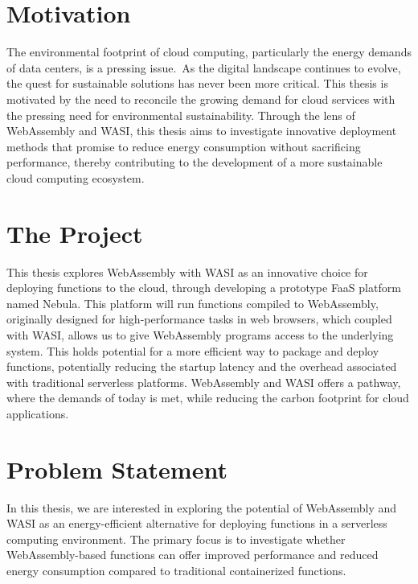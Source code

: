 \documentclass[
  table]{report}
\begin{document}
\section{Motivation}
\label{sect:motivation}

The environmental footprint of cloud computing, particularly the energy
demands of data centers, is a pressing issue.~As the digital landscape
continues to evolve, the quest for sustainable solutions has never been
more critical. This thesis is motivated by the need to reconcile the
growing demand for cloud services with the pressing need for
environmental sustainability. Through the lens of WebAssembly and
\ac{WASI}, this thesis aims to investigate innovative deployment methods
that promise to reduce energy consumption without sacrificing
performance, thereby contributing to the development of a more
sustainable cloud computing ecosystem.

\section{The Project}
\label{sect:project}

This thesis explores WebAssembly with \ac{WASI} as an innovative choice
for deploying functions to the cloud, through developing a prototype
\ac{FaaS} platform named Nebula. This platform will run functions
compiled to WebAssembly, originally designed for high-performance tasks
in web browsers, which coupled with \ac{WASI}, allows us to give
WebAssembly programs access to the underlying system. This holds
potential for a more efficient way to package and deploy functions,
potentially reducing the startup latency and the overhead associated
with traditional serverless platforms. WebAssembly and \ac{WASI} offers
a pathway, where the demands of today is met, while reducing the carbon
footprint for cloud applications.

\section{Problem Statement}
\label{sect:problems}

In this thesis, we are interested in exploring the potential of
WebAssembly and \ac{WASI} as an energy-efficient alternative for
deploying functions in a serverless computing environment. The primary
focus is to investigate whether WebAssembly-based functions can offer
improved performance and reduced energy consumption compared to
traditional containerized functions.
\end{document}
